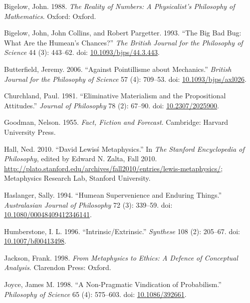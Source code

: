 \documentclass[
  10pt,
  letterpaper,
  DIV=11,
  numbers=noendperiod,
  twoside]{scrartcl}
\newlength{\cslhangindent}
\newenvironment{CSLReferences}[2] %
 {\begin{list}{}{%
  \setlength{\itemindent}{0pt}
  \setlength{\leftmargin}{0pt}
  \setlength{\parsep}{0pt}
  \ifodd #1
   \setlength{\leftmargin}{\cslhangindent}
   \setlength{\itemindent}{-1\cslhangindent}
  \fi
  \setlength{\itemsep}{#2\baselineskip}}}
 {\end{list}}
\begin{document}
\label{refs}
\begin{CSLReferences}{1}{0}
Bigelow, John. 1988. \emph{The Reality of Numbers: A Physicalist's
Philosophy of Mathematics}. Oxford: Oxford.

Bigelow, John, John Collins, and Robert Pargetter. 1993. {``The Big Bad
Bug: What Are the Humean's Chances?''} \emph{The British Journal for the
Philosophy of Science} 44 (3): 443--62. doi:
\href{https://doi.org/10.1093/bjps/44.3.443}{10.1093/bjps/44.3.443}.

Butterfield, Jeremy. 2006. {``Against Pointillisme about Mechanics.''}
\emph{British Journal for the Philosophy of Science} 57 (4): 709--53.
doi: \href{https://doi.org/10.1093/bjps/axl026}{10.1093/bjps/axl026}.

Churchland, Paul. 1981. {``Eliminative Materialism and the Propositional
Attitudes.''} \emph{Journal of Philosophy} 78 (2): 67--90. doi:
\href{https://doi.org/10.2307/2025900}{10.2307/2025900}.

Goodman, Nelson. 1955. \emph{Fact, Fiction and Forecast}. Cambridge:
Harvard University Press.

Hall, Ned. 2010. {``David Lewisś Metaphysics.''} In \emph{The Stanford
Encyclopedia of Philosophy}, edited by Edward N. Zalta, Fall 2010.
\url{http://plato.stanford.edu/archives/fall2010/entries/lewis-metaphysics/};
Metaphysics Research Lab, Stanford University.

Haslanger, Sally. 1994. {``Humean Supervenience and Enduring Things.''}
\emph{Australasian Journal of Philosophy} 72 (3): 339--59. doi:
\href{https://doi.org/10.1080/00048409412346141}{10.1080/00048409412346141}.

Humberstone, I. L. 1996. {``Intrinsic/Extrinsic.''} \emph{Synthese} 108
(2): 205--67. doi:
\href{https://doi.org/10.1007/bf00413498}{10.1007/bf00413498}.

Jackson, Frank. 1998. \emph{From Metaphysics to Ethics: A Defence of
Conceptual Analysis}. Clarendon Press: Oxford.

Joyce, James M. 1998. {``A Non-Pragmatic Vindication of Probabilism.''}
\emph{Philosophy of Science} 65 (4): 575--603. doi:
\href{https://doi.org/10.1086/392661}{10.1086/392661}.


\end{CSLReferences}
\end{document}
